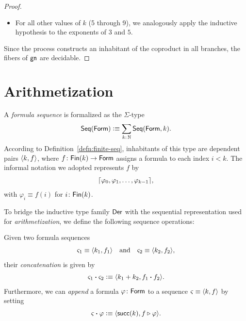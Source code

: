 \begin{proof}
\begin{itemize}
        \item For all other values of $k$ (5 through 9), we analogously apply the inductive hypothesis to the exponents of $3$ and $5$.
    \end{itemize}
    Since the process constructs an inhabitant of the coproduct in all branches, the fibers of $\mathsf{gn}$ are decidable.
    
\end{proof}

\section{Arithmetization}

\begin{defn}
    A \textsl{formula sequence} is formalized as the $\Sigma$-type
    \[
        \fun{Seq}(\fun{Form})
            \defeq\sum_{k\colon\N}\fun{Seq}(\fun{Form},k).
    \]
    According to Definition~\ref{defn:finite-seq}, inhabitants of this type are dependent pairs $\langle k,f\rangle$, where $f\colon\fun{Fin}(k)\to\fun{Form}$ assigns a formula to each index $i<k$. The informal notation we adopted represents $f$ by
    \[
        {\lceil\varphi_0,\varphi_1,\dots,\varphi_{k-1}\rceil},
    \]
    with $\varphi_i\equiv f(i)$ for $i\colon\fun{Fin}(k)$.
\end{defn}

To bridge the inductive type family $\mathsf{Der}$ with the sequential representation used for \textit{arithmetization}, we define the following sequence operations:

\begin{defn}[Concatenation]
    Given two formula sequences
    \[
        \varsigma_1\equiv\langle k_1,f_1\rangle
        \quad\text{and}\quad
        \varsigma_2\equiv\langle k_2,f_2\rangle,
    \]
    their \textsl{concatenation} is given by
    \[
        \varsigma_1\mathbin{\boldsymbol{\cdot}}\varsigma_2
            \mathrel{\vcentcolon}\equiv\langle k_1+k_2,f_1\mathbin{\boldsymbol{\cdot}} f_2\rangle.
    \]
    Furthermore, we can \textsl{append} a formula $\varphi\colon\fun{Form}$ to a sequence $\varsigma\equiv\langle k,f\rangle$ by setting
    \[
        \varsigma\mathbin{\boldsymbol{\cdot}}\varphi
            \mathrel{\vcentcolon}\equiv\langle\mathsf{succ}(k),f\triangleright\varphi\rangle.
    \]
\end{defn}

